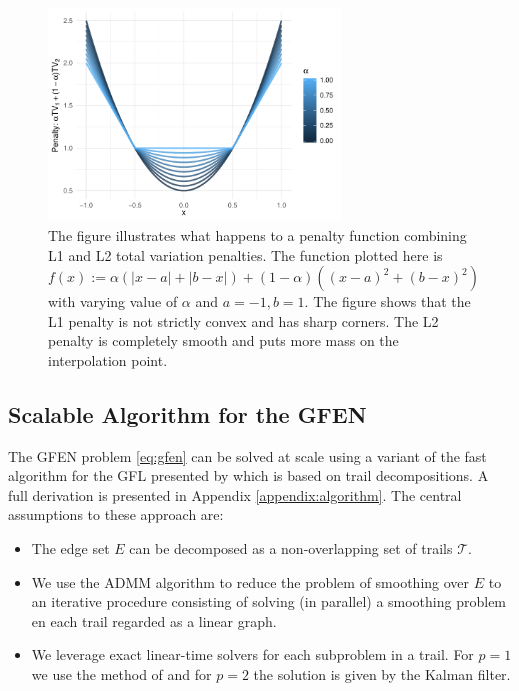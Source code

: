 \documentclass[a4paper, 11pt]{article}
\begin{document}
\begin{figure}[tb]
    \centering
    \includegraphics[width=220pt]{img/elastic-penalty.pdf}
    \caption{The figure illustrates what happens to a penalty function combining L1 and L2 total variation penalties. The function plotted here is  $f(x) := \alpha \left(|x - a| + |b - x|\right) + (1 - \alpha) \left((x - a)^2 + (b - x)^2\right)$ with varying value of $\alpha$ and $a=-1, b=1$. The figure shows that the L1 penalty is not strictly convex and has sharp corners. The L2 penalty is completely smooth and puts more mass on the interpolation point.}
    \label{fig:methods:l1-l2}
\end{figure}


\subsection{Scalable Algorithm for the GFEN}
 
 The GFEN problem \eqref{eq:gfen} can be solved at scale using a variant of the fast algorithm for the GFL presented by \citet{tansey-scott-2015} which is based on trail decompositions. A full derivation is presented in Appendix \ref{appendix:algorithm}. The central assumptions to these approach are:
 \begin{itemize}[itemsep=0pt, partopsep=0pt]
     \item The edge set $E$ can be decomposed as a non-overlapping set of trails $\mathcal{T}$. %
     \item We use the ADMM algorithm \citep[see]{boyd2011distributed} to reduce the problem of smoothing over $E$ to an iterative procedure consisting of solving (in parallel) a smoothing problem en each trail regarded as a linear graph.
     \item We leverage exact linear-time solvers for each subproblem in a trail. For $p=1$ we use the method of \citet{barbero-sra-2018} and for $p=2$ the solution is given by the Kalman filter.
 \end{itemize}
 
\end{document}
